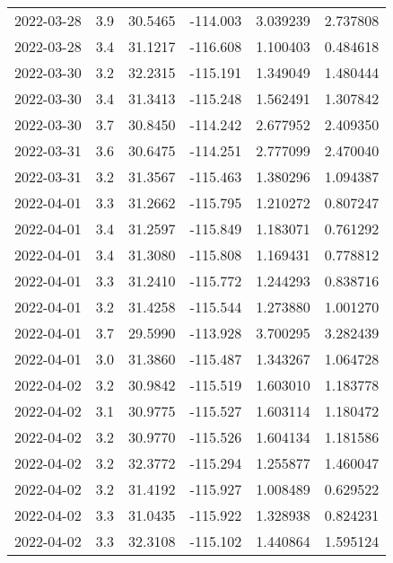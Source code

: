 \begin{tabular}{lrrrrr}
2022-03-28 &       3.9 &  30.5465 &  -114.003 &         3.039239 &         2.737808 \\
2022-03-28 &       3.4 &  31.1217 &  -116.608 &         1.100403 &         0.484618 \\
2022-03-30 &       3.2 &  32.2315 &  -115.191 &         1.349049 &         1.480444 \\
2022-03-30 &       3.4 &  31.3413 &  -115.248 &         1.562491 &         1.307842 \\
2022-03-30 &       3.7 &  30.8450 &  -114.242 &         2.677952 &         2.409350 \\
2022-03-31 &       3.6 &  30.6475 &  -114.251 &         2.777099 &         2.470040 \\
2022-03-31 &       3.2 &  31.3567 &  -115.463 &         1.380296 &         1.094387 \\
2022-04-01 &       3.3 &  31.2662 &  -115.795 &         1.210272 &         0.807247 \\
2022-04-01 &       3.4 &  31.2597 &  -115.849 &         1.183071 &         0.761292 \\
2022-04-01 &       3.4 &  31.3080 &  -115.808 &         1.169431 &         0.778812 \\
2022-04-01 &       3.3 &  31.2410 &  -115.772 &         1.244293 &         0.838716 \\
2022-04-01 &       3.2 &  31.4258 &  -115.544 &         1.273880 &         1.001270 \\
2022-04-01 &       3.7 &  29.5990 &  -113.928 &         3.700295 &         3.282439 \\
2022-04-01 &       3.0 &  31.3860 &  -115.487 &         1.343267 &         1.064728 \\
2022-04-02 &       3.2 &  30.9842 &  -115.519 &         1.603010 &         1.183778 \\
2022-04-02 &       3.1 &  30.9775 &  -115.527 &         1.603114 &         1.180472 \\
2022-04-02 &       3.2 &  30.9770 &  -115.526 &         1.604134 &         1.181586 \\
2022-04-02 &       3.2 &  32.3772 &  -115.294 &         1.255877 &         1.460047 \\
2022-04-02 &       3.2 &  31.4192 &  -115.927 &         1.008489 &         0.629522 \\
2022-04-02 &       3.3 &  31.0435 &  -115.922 &         1.328938 &         0.824231 \\
2022-04-02 &       3.3 &  32.3108 &  -115.102 &         1.440864 &         1.595124 \\

\end{tabular}
